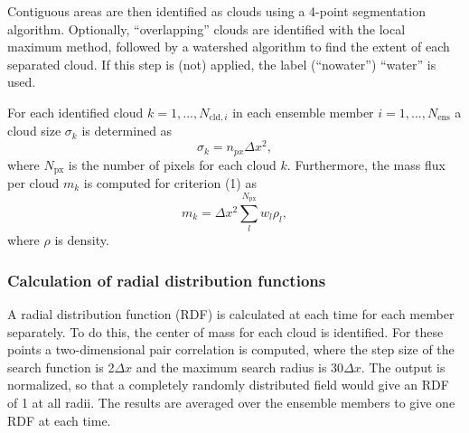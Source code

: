 \documentclass[a4paper, 12pt]{article}
\begin{document}
Contiguous areas are then identified as clouds using a 4-point segmentation algorithm. Optionally, ``overlapping'' clouds are identified with the local maximum method, followed by a watershed algorithm to find the extent of each separated cloud. If this step is (not) applied, the label (``nowater'') ``water'' is used. 

For each identified cloud $k=1,...,N_{\mathrm{cld},i}$ in each ensemble member $i=1,...,N_{\mathrm{ens}}$ a cloud size $\sigma_k$ is determined as
\begin{equation} \label{eq:cld_size}
 \sigma_k = n_{px} \Delta x^2,
\end{equation}
where $N_{\mathrm{px}}$ is the number of pixels for each cloud $k$. Furthermore, the mass flux per cloud $m_k$ is computed for criterion (1) as
\begin{equation} \label{eq:mass_flux_per_cloud}
 m_k = \Delta x^2 \sum_{l}^{N_{\mathrm{px}}} w_l \rho_l,
\end{equation}
where $\rho$ is density.

\subsubsection{Calculation of radial distribution functions}
A radial distribution function (RDF) is calculated at each time for each member separately. To do this, the center of mass for each cloud is identified. For these points a two-dimensional pair correlation is computed, where the step size of the search function is 2$\Delta x$ and the maximum search radius is 30$\Delta x$. The output is normalized, so that a completely randomly distributed field would give an RDF of 1 at all radii. The results are averaged over the ensemble members to give one RDF at each time. 

\end{document}
